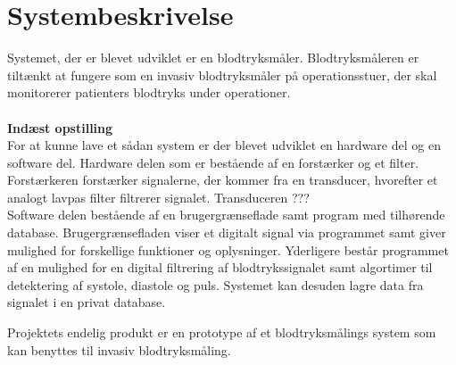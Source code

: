 \chapter{Systembeskrivelse}
Systemet, der er blevet udviklet er en blodtryksmåler. Blodtryksmåleren er tiltænkt at fungere som en invasiv blodtryksmåler på operationsstuer, der skal monitorerer patienters blodtryks under operationer.\\
\\ \textbf{Indæst opstilling}
\\
For at kunne lave et sådan system er der blevet udviklet en hardware del og en software del. 
Hardware delen som er bestående af en forstærker og et filter. Forstærkeren forstærker signalerne, der kommer fra en transducer, hvorefter et analogt lavpas filter filtrerer signalet. Transduceren ??? \\ [1ex]

Software delen bestående af en brugergrænseflade samt program med tilhørende database. Brugergrænsefladen viser et digitalt signal via programmet samt giver mulighed for forskellige funktioner og oplysninger. Yderligere består programmet af en mulighed for en digital filtrering af blodtrykssignalet samt algortimer til detektering af systole, diastole og puls. Systemet kan desuden lagre data fra signalet i en privat database.    

Projektets endelig produkt er en prototype af et blodtryksmålings system som kan benyttes til invasiv blodtryksmåling. 


